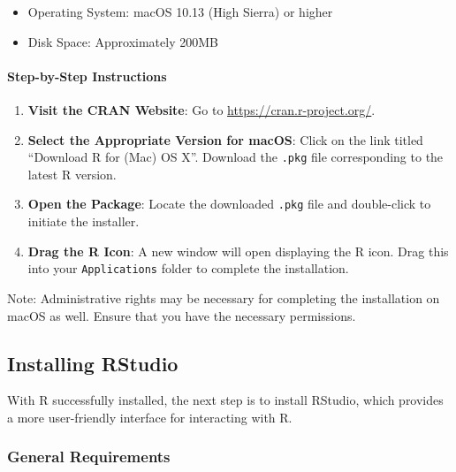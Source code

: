 \documentclass[
]{book}
\newenvironment{Shaded}{\begin{snugshade}}{\end{snugshade}}
\newcommand{\NormalTok}[1]{#1}
\providecommand{\tightlist}{%
  \setlength{\itemsep}{0pt}\setlength{\parskip}{0pt}}
\begin{document}
\begin{itemize}
\tightlist
\item
  Operating System: macOS 10.13 (High Sierra) or higher
\item
  Disk Space: Approximately 200MB
\end{itemize}

\hypertarget{step-by-step-instructions-1}{%
\paragraph*{Step-by-Step Instructions}\label{step-by-step-instructions-1}}

\begin{enumerate}
\def\labelenumi{\arabic{enumi}.}
\item
  \textbf{Visit the CRAN Website}: Go to \url{https://cran.r-project.org/}.
\item
  \textbf{Select the Appropriate Version for macOS}: Click on the link titled ``Download R for (Mac) OS X''. Download the \texttt{.pkg} file corresponding to the latest R version.
\item
  \textbf{Open the Package}: Locate the downloaded \texttt{.pkg} file and double-click to initiate the installer.
\item
  \textbf{Drag the R Icon}: A new window will open displaying the R icon. Drag this into your \texttt{Applications} folder to complete the installation.
\end{enumerate}

\begin{Shaded}
\begin{Highlighting}[]
\NormalTok{Note: Administrative rights may be necessary for completing the installation on macOS as well. Ensure that you have the necessary permissions.}
\end{Highlighting}
\end{Shaded}

\hypertarget{installing-rstudio}{%
\subsection*{Installing RStudio}\label{installing-rstudio}}

With R successfully installed, the next step is to install RStudio, which provides a more user-friendly interface for interacting with R.

\hypertarget{general-requirements}{%
\subsubsection*{General Requirements}\label{general-requirements}}
\end{document}

